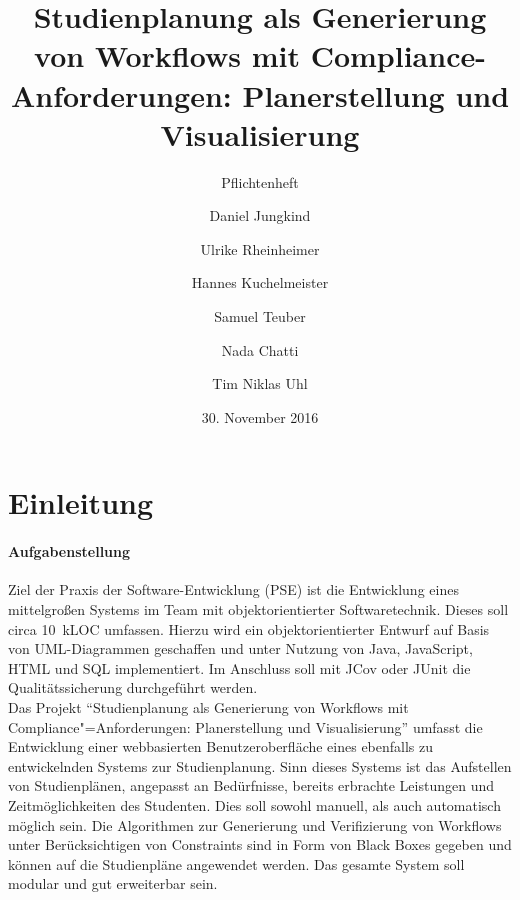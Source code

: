 \documentclass[titlepage=true, parskip=full]{scrartcl}
\title{Studienplanung als Generierung von Workflows mit Compliance-Anforderungen: Planerstellung und Visualisierung}
\subtitle{Pflichtenheft}
\author{Daniel Jungkind \and Ulrike Rheinheimer \and Hannes Kuchelmeister \and Samuel Teuber \and Nada Chatti \and Tim Niklas Uhl}
\date{30. November 2016}
\begin{document}
\maketitle
\tableofcontents
\pagebreak

%
\section{Einleitung}
\paragraph{Aufgabenstellung}
Ziel der Praxis der Software-Entwicklung (PSE) ist die Entwicklung eines mittelgroßen Systems im Team mit objektorientierter Softwaretechnik. Dieses soll circa 10~kLOC umfassen. Hierzu wird ein objektorientierter Entwurf auf Basis von UML-Diagrammen geschaffen und unter Nutzung von Java, JavaScript, HTML und SQL implementiert. Im Anschluss soll mit JCov oder JUnit die Qualitätssicherung durchgeführt werden.\\
Das Projekt \enquote{Studienplanung als Generierung von Workflows mit Compliance"=Anforderungen: Planerstellung und Visualisierung} umfasst die Entwicklung einer webbasierten Benutzeroberfläche eines ebenfalls zu entwickelnden Systems zur Studienplanung. Sinn dieses Systems ist das Aufstellen von Studienplänen, angepasst an Bedürfnisse, bereits erbrachte Leistungen und Zeitmöglichkeiten des Studenten. Dies soll sowohl manuell, als auch automatisch möglich sein. Die Algorithmen zur Generierung und Verifizierung von Workflows unter Berücksichtigen von Constraints sind in Form von Black Boxes gegeben und können auf die Studienpläne angewendet werden. Das gesamte System soll modular und gut erweiterbar sein.\\
\end{document}
